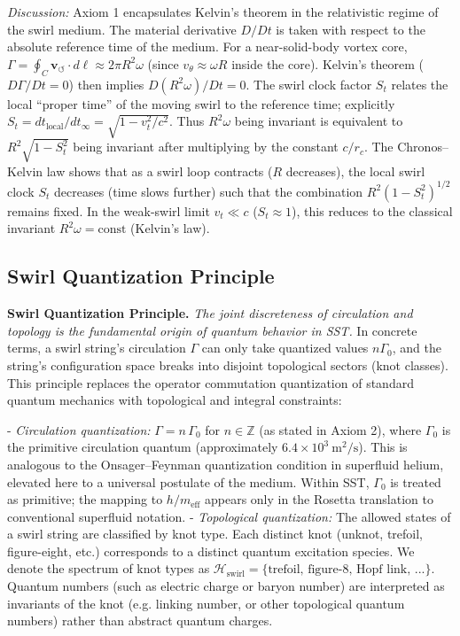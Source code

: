 \documentclass[10pt,reprint,aps,onecolumn,nofootinbib]{revtex4-2}
\newcommand{\vswirl}{\mathbf{v}_{\!\boldsymbol{\circlearrowleft}}}
\begin{document}
	\noindent \textit{Discussion:} Axiom 1 encapsulates Kelvin’s theorem in the relativistic regime of the swirl medium. The material derivative $D/Dt$ is taken with respect to the absolute reference time of the medium. For a near-solid-body vortex core, $\Gamma = \oint_C \vswirl\cdot d\ell \approx 2\pi R^2 \omega$ (since $v_{\theta}\approx \omega R$ inside the core). Kelvin’s theorem ($D\Gamma/Dt=0$) then implies $D(R^2 \omega)/Dt=0$. The swirl clock factor $S_t$ relates the local “proper time” of the moving swirl to the reference time; explicitly $S_t = dt_{\text{local}}/dt_{\infty} = \sqrt{1 - v_t^2/c^2}$. Thus $R^2 \omega$ being invariant is equivalent to $R^2 \sqrt{1 - S_t^2}$ being invariant after multiplying by the constant $c/r_c$. The Chronos–Kelvin law shows that as a swirl loop contracts ($R$ decreases), the local swirl clock $S_t$ decreases (time slows further) such that the combination $R^2 (1-S_t^2)^{1/2}$ remains fixed. In the weak-swirl limit $v_t \ll c$ ($S_t\approx 1$), this reduces to the classical invariant $R^2 \omega = \text{const}$ (Kelvin’s law).


	\subsection*{Swirl Quantization Principle}
	\textbf{Swirl Quantization Principle.} \emph{The joint discreteness of circulation and topology is the fundamental origin of quantum behavior in SST.} In concrete terms, a swirl string's circulation $\Gamma$ can only take quantized values $n\Gamma_0$, and the string's configuration space breaks into disjoint topological sectors (knot classes). This principle replaces the operator commutation quantization of standard quantum mechanics with topological and integral constraints:

	- \emph{Circulation quantization:} $\Gamma = n\,\Gamma_0$ for $n\in\mathbb{Z}$ (as stated in Axiom 2), where $\Gamma_0$ is the primitive circulation quantum (approximately $6.4\times 10^{3}~\mathrm{m^2/s}$). This is analogous to the Onsager–Feynman quantization condition in superfluid helium, elevated here to a universal postulate of the medium. Within SST, $\Gamma_0$ is treated as primitive; the mapping to $h/m_{\text{eff}}$ appears only in the Rosetta translation to conventional superfluid notation.
	- \emph{Topological quantization:} The allowed states of a swirl string are classified by knot type. Each distinct knot (unknot, trefoil, figure-eight, etc.) corresponds to a distinct quantum excitation species. We denote the spectrum of knot types as $\mathcal{H}_{\text{swirl}} = \{\text{trefoil, figure-8, Hopf link, ...}\}$. Quantum numbers (such as electric charge or baryon number) are interpreted as invariants of the knot (e.g. linking number, or other topological quantum numbers) rather than abstract quantum charges.
\end{document}
